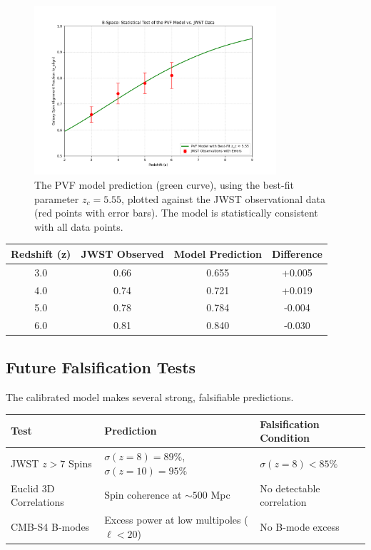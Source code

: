 \documentclass{BSpacePaper} %
\begin{document}
\begin{figure}[h!]
    \centering
    \includegraphics[width=0.8\textwidth]{PVF_model_prediction.png} %
    \caption{The PVF model prediction (green curve), using the best-fit parameter $z_c = 5.55$, plotted against the JWST observational data (red points with error bars). The model is statistically consistent with all data points.}
    \label{fig:main_plot}
\end{figure}

\begin{center}
    \captionsetup{type=table}
    \label{tab:results}
    \begin{tabular}{@{}cccc@{}}
    \toprule
    \textbf{Redshift (z)} & \textbf{JWST Observed} & \textbf{Model Prediction} & \textbf{Difference} \\ \midrule
    3.0 & 0.66 & 0.655 & +0.005 \\
    4.0 & 0.74 & 0.721 & +0.019 \\
    5.0 & 0.78 & 0.784 & -0.004 \\
    6.0 & 0.81 & 0.840 & -0.030 \\ \bottomrule
    \end{tabular}
\end{center}

\subsection{Future Falsification Tests}
The calibrated model makes several strong, falsifiable predictions.

\begin{center}
    \captionsetup{type=table}
    \begin{tabular}{@{}lll@{}}
    \toprule
    \textbf{Test} & \textbf{Prediction} & \textbf{Falsification Condition} \\ \midrule
    JWST $z>7$ Spins & $\sigma(z=8) = 89\%$, $\sigma(z=10) = 95\%$ & $\sigma(z=8) < 85\%$ \\
    Euclid 3D Correlations & Spin coherence at $\sim 500$ Mpc & No detectable correlation \\
    CMB-S4 B-modes & Excess power at low multipoles ($\ell < 20$) & No B-mode excess \\ \bottomrule
    \end{tabular}
\end{center}
\end{document}
